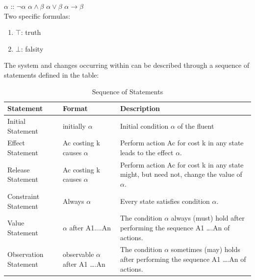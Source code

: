 \documentclass[11pt]{article}
\begin{document}
	$\alpha$ :: $\neg\alpha$ \textbar $\alpha\wedge\beta$ \textbar $\alpha\vee\beta$ \textbar $\alpha\rightarrow\beta$\\
	Two specific formulas:
	\begin{enumerate}
	\item $\top$: truth
	\item $\bot$: falsity
	\end{enumerate}
	The system and changes occurring within can be described through a sequence of statements defined in the table:
	\begin{table}[h]
		\centering
			\begin{tabular}{|p{2cm}|p{3cm}|p{8cm}|}
				\hline
				\bfseries Statement & \bfseries Format & \bfseries Description\\
				\hline
				Initial Statement & initially \(\alpha\) & Initial condition \(\alpha\) of the fluent \\
				\hline
				Effect Statement & Ac costing k causes \(\alpha\) & Perform action Ac for cost k in any state leads to the effect \(\alpha\).\\
				\hline	
				Release Statement & Ac costing k causes \(\alpha\) & Perform action Ac for cost k in any state might, but need not, change the value of \(\alpha\).\\
				\hline
				Constraint Statement & Always \(\alpha\) & Every state satisfies condition \(\alpha\).\\
				\hline
				Value Statement & \(\alpha\) after A1....An & The condition \(\alpha\) always (must) hold after performing the sequence A1 ….An of actions.\\
				\hline
				Observation Statement & observable \(\alpha\) after A1 ….An & The condition \(\alpha\) sometimes (may) holds after performing the sequence A1 ….An of actions.\\
				\hline
			\end{tabular}
		\caption{Sequence of Statements}
		\label{tab:table01}
	\end{table}
\end{document}
